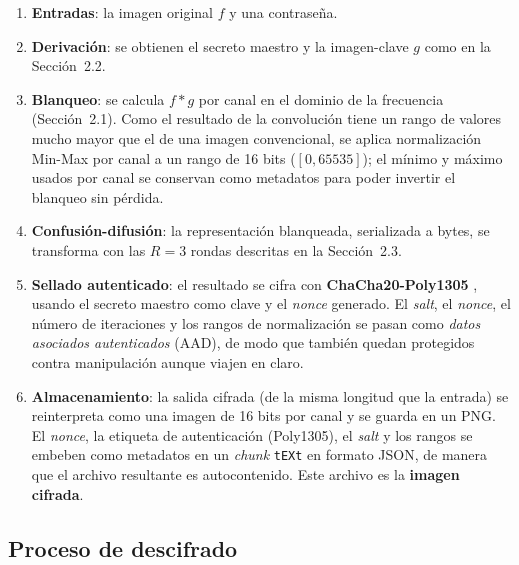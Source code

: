 \documentclass{llncs}
\begin{document}
\begin{enumerate}
  \item \textbf{Entradas}: la imagen original $f$ y una contrase\~na.
  \item \textbf{Derivaci\'on}: se obtienen el secreto maestro y la
    imagen-clave $g$ como en la Secci\'on~2.2.
  \item \textbf{Blanqueo}: se calcula $f*g$ por canal en el dominio de la
    frecuencia (Secci\'on~2.1). Como el resultado de la convoluci\'on tiene
    un rango de valores mucho mayor que el de una imagen convencional, se
    aplica normalizaci\'on Min-Max por canal a un rango de 16 bits
    ($[0,65535]$); el m\'inimo y m\'aximo usados por canal se conservan como
    metadatos para poder invertir el blanqueo sin p\'erdida.
  \item \textbf{Confusi\'on-difusi\'on}: la representaci\'on blanqueada,
    serializada a bytes, se transforma con las $R=3$ rondas descritas en la
    Secci\'on~2.3.
  \item \textbf{Sellado autenticado}: el resultado se cifra con
    \textbf{ChaCha20-Poly1305} \cite{rfc8439}, usando el secreto maestro
    como clave y el \emph{nonce} generado. El \emph{salt}, el \emph{nonce},
    el n\'umero de iteraciones y los rangos de normalizaci\'on se pasan como
    \emph{datos asociados autenticados} (AAD), de modo que tambi\'en quedan
    protegidos contra manipulaci\'on aunque viajen en claro.
  \item \textbf{Almacenamiento}: la salida cifrada (de la misma longitud que
    la entrada) se reinterpreta como una imagen de 16 bits por canal y se
    guarda en un PNG. El \emph{nonce}, la etiqueta de autenticaci\'on
    (Poly1305), el \emph{salt} y los rangos se embeben como metadatos en un
    \emph{chunk} \texttt{tEXt} en formato JSON, de manera que el archivo
    resultante es autocontenido. Este archivo es la \textbf{imagen cifrada}.
\end{enumerate}

\subsection{Proceso de descifrado}
\end{document}
